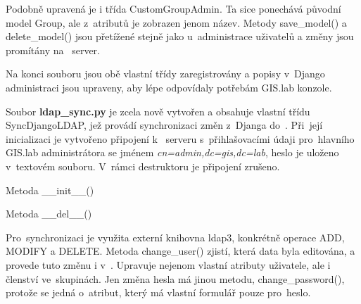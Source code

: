 Podobně upravená je i třída \textsf{CustomGroupAdmin}. Ta sice
ponechává původní model \textsf{Group}, ale z~atributů je zobrazen
jenom název. Metody \textsf{save\_model()} a \textsf{delete\_model()}
jsou přetížené stejně jako u~administrace uživatelů a změny jsou
promítány na~ server.

Na konci souboru jsou obě vlastní třídy zaregistrovány a popisy 
v~Django administraci jsou upraveny, aby lépe odpovídaly potřebám
GIS.lab konzole.

Soubor \textbf{ldap\_sync.py} je zcela nově vytvořen a obsahuje
vlastní třídu \linebreak \textsf{SyncDjangoLDAP}, jež provádí synchronizaci změn
z~Djanga do~. Při~její inicializaci je vytvořeno připojení 
k~ serveru s~přihlašovacími údaji pro~hlavního GIS.lab
administrátora se jménem \textit{cn=admin,dc=gis,dc=lab}, heslo je
uloženo v~textovém souboru. V~rámci destruktoru je připojení zrušeno.

\begin{algorithm}
\caption{Metoda \_\_init\_\_()}
\label{alg:init}
	\begin{algorithmic} [1]
	\end{algorithmic}
\end{algorithm}

\begin{algorithm}
\caption{Metoda \_\_del\_\_()}
\label{alg:del}
	\begin{algorithmic} [1]
	\end{algorithmic}
\end{algorithm}

Pro~synchronizaci je využita externí knihovna ldap3, konkrétně operace
\textsf{ADD}, \textsf{MODIFY} a \textsf{DELETE}. Metoda
\textsf{change\_user()} zjistí, která data byla editována, a provede
tuto změnu i v~. Upravuje nejenom vlastní atributy uživatele,
ale i členství ve~skupinách. Jen změna hesla má jinou metodu,
\textsf{change\_password()}, protože se jedná o~atribut, který má
vlastní formulář pouze pro~heslo.


